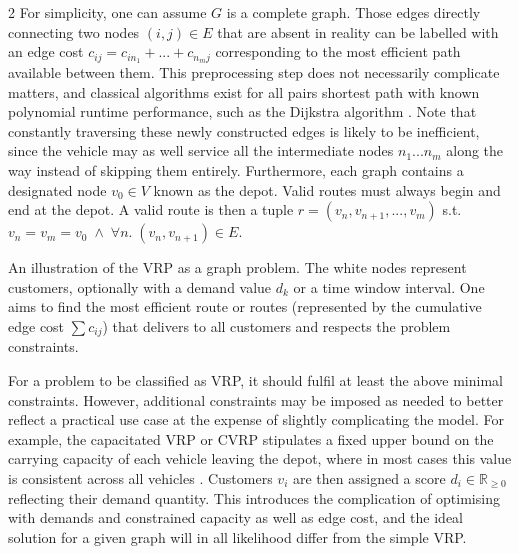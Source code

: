 \documentclass [10pt]{article}
\begin{document}
\begin {multicols}{2}
For simplicity, one can assume $G$ is a complete graph. Those edges directly
connecting two nodes $(i, j) \in E$ that are absent in reality can be labelled
with an edge cost $c_{ij} = c_{i n_1} + ... + c_{n_m j}$ corresponding to
the most efficient path available between them. This preprocessing step does
not necessarily complicate matters, and classical algorithms exist for all
pairs shortest path with known polynomial runtime performance, such as
the Dijkstra algorithm \cite{dijkstra}. Note that constantly traversing these
newly constructed edges is likely to be inefficient, since the vehicle may as
well service all the intermediate nodes $n_1 ... n_m$ along the way instead
of skipping them entirely. Furthermore, each graph contains a designated node
$v_0 \in V$ known as the depot. Valid routes must always begin and end at the
depot. A valid route is then a tuple $r = (v_n, v_{n+1}, ..., v_m)$ s.t.
$v_n = v_m = v_0 \; \land \; \forall n. \; (v_n, v_{n+1}) \in E$.

\vspace {0.3cm}
\begin {center}
	{
	An illustration of the VRP as a graph problem. The white nodes represent
	customers, optionally with a demand value $d_k$ or a time window interval.
	One aims to find the most efficient route or routes (represented by the
	cumulative edge cost $\sum{c_{ij}}$) that delivers to all customers and
	respects the problem constraints.
}
\end {center}
\vspace {0.3cm}

For a problem to be classified as VRP, it should fulfil at least the above
minimal constraints. However, additional constraints may be imposed as
needed to better reflect a practical use case at the expense of slightly
complicating the model. For example, the capacitated VRP or CVRP stipulates
a fixed upper bound on the carrying capacity of each vehicle leaving the
depot, where in most cases this value is consistent across all vehicles
\cite{cvrpanneal}.
Customers $v_i$ are then assigned a score $d_i \in \mathbb R_{\ge 0}$ 
reflecting their demand quantity. This introduces the complication of
optimising with demands and constrained capacity as well as edge cost, and
the ideal solution for a given graph will in all likelihood differ from the
simple VRP.


\end{multicols}
\end{document}
